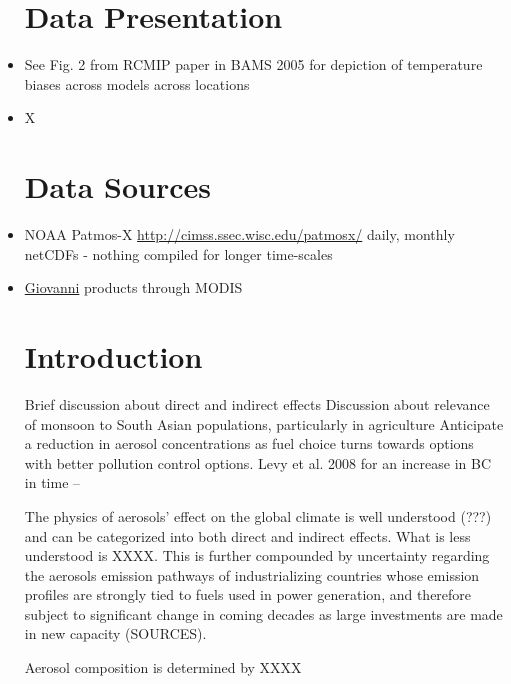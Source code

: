 \documentclass[11pt,reqno]{amsart}
\begin{document}
\begin{itemize}
\begin{itemize}
	
	\end{itemize}


\section{Data Presentation}
\item See Fig. 2 from RCMIP paper in BAMS 2005 for depiction of temperature biases across models across locations 

\item X







\section{Data Sources}
\item NOAA Patmos-X  \href{http://cimss.ssec.wisc.edu/patmosx/}{http://cimss.ssec.wisc.edu/patmosx/} daily, monthly netCDFs - nothing compiled for longer time-scales
\item \href{http://gdata1.sci.gsfc.nasa.gov/daac-bin/G3/gui.cgi?instance_id=MODIS_DAILY_L3&gsid=MODIS_DAILY_L3_160.39.231.134_1402350812&selectedWSID=140235120431683&app=latlonplot_diff&selectedMap=}{Giovanni} products through MODIS 


\section{Introduction}

Brief discussion about direct and indirect effects
Discussion about relevance of monsoon to South Asian populations, particularly in agriculture 
Anticipate a reduction in aerosol concentrations as fuel choice turns towards options with better pollution control options.  
Levy et al. 2008 for an increase in BC in time -- 

The physics of aerosols' effect on the global climate is well understood (???) and can be categorized into both direct and indirect effects.  What is less understood is XXXX.  This is further compounded by uncertainty regarding the aerosols emission pathways of industrializing countries whose emission profiles are strongly tied to fuels used in power generation, and therefore subject to significant change in coming decades as large investments are made in new capacity (SOURCES).  

Aerosol composition is determined by XXXX 




\end{itemize}
\end{document}
